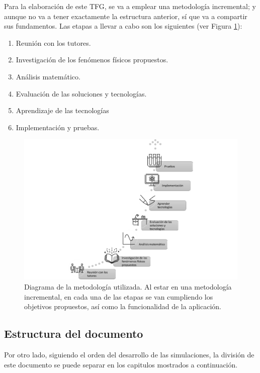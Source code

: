 \documentclass[../main.tex]{subfiles}
\begin{document}
Para la elaboración de este TFG, se va a emplear una metodología incremental; y aunque no va a tener exactamente la estructura anterior, sí que va a compartir sus fundamentos. Las etapas a llevar a cabo son los siguientes (ver Figura \ref{fig:1.2}):

\begin{enumerate}
    \item Reunión con los tutores.
    \item Investigación de los fenómenos físicos propuestos.
    \item Análisis matemático.
    \item Evaluación de las soluciones y tecnologías.
    \item Aprendizaje de las tecnologías 
    \item Implementación y pruebas.
\end{enumerate}

\begin{figure}[!h]
    \centering
    \includegraphics{images/Figura1.2.png}
    \caption{Diagrama de la metodología utilizada. Al estar en una metodología incremental, en cada una de las etapas se van cumpliendo los objetivos propuestos, así como la funcionalidad de la aplicación.}
    \label{fig:1.2}
\end{figure}


\subsection{Estructura del documento}
Por otro lado, siguiendo el orden del desarrollo de las simulaciones, la división de este documento se puede separar en los capitulos mostrados a continuación.
\end{document}
